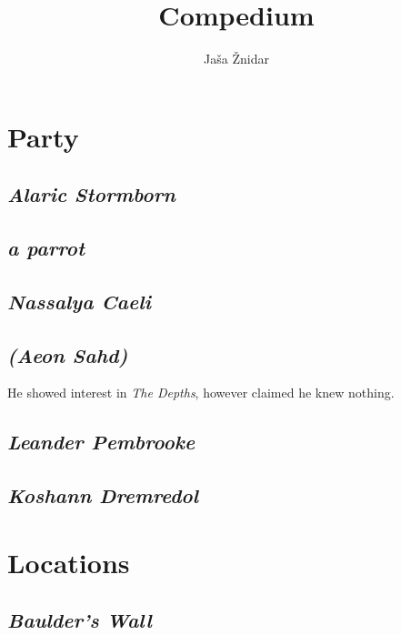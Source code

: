 \documentclass{article}
\title{Compedium}
\author{Jaša Žnidar}
\begin{document}
\maketitle

\begin{multicols}{2}

    \section{Party}

    \subsection{\textit{Alaric Stormborn}}

    \subsection{\textit{a parrot}}

    \subsection{\textit{Nassalya Caeli}}

    \subsection{\textit{\textLambda\textSigma\textTheta\textNu (Aeon Sahd)}}

    He showed interest in \textit{The Depths}, however claimed he knew nothing.

    \subsection{\textit{Leander Pembrooke}}

    \subsection{\textit{Koshann Dremredol}}

    \section{Locations}

    \subsection{\textit{Baulder's Wall}}


\end{multicols}
\end{document}
